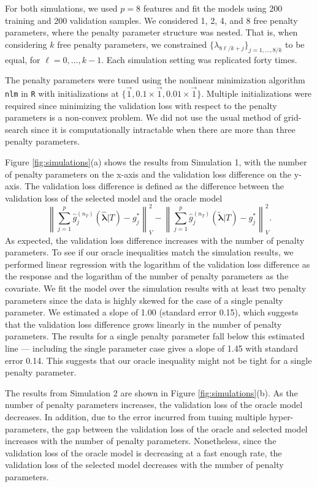 \documentclass[12pt]{article} %
\theoremstyle{definition}
\begin{document}
For both simulations, we used $p = 8$ features and fit the models using 200 training and 200 validation samples. We considered 1, 2, 4, and 8 free penalty parameters, where the penalty parameter structure was nested. That is, when considering $k$ free penalty parameters, we constrained $\{\lambda_{8\ell/k + j} \}_{j = 1,...,8/k}$ to be equal, for $\ell= 0,...,k - 1$. Each simulation setting was replicated forty times.

The penalty parameters were tuned using the nonlinear minimization algorithm \texttt{nlm} in \texttt{R} with initializations at $\{\vec{1}, 0.1 \times \vec{1}, 0.01 \times \vec{1}\}$. 
Multiple initializations were required since minimizing the validation loss with respect to the penalty parameters is a non-convex problem.
We did not use the usual method of grid-search since it is computationally intractable when there are more than three penalty parameters.

Figure \ref{fig:simulations}(a) shows the results from Simulation 1, with the number of penalty parameters on the x-axis and the validation loss difference on the y-axis. The validation loss difference is defined as the difference between the validation loss of the selected model and the oracle model
$$
\left \| \sum_{j=1}^p \hat{g}^{(n_T)}_j(\hat{\boldsymbol{\lambda}}|T) - g^*_j \right \|_V^2 - 
\left \| \sum_{j=1}^p \hat{g}^{(n_T)}_j(\tilde{\boldsymbol{\lambda}} | T) - g^*_j \right \|_V^2.
$$
As expected, the validation loss difference increases with the number of penalty parameters.
To see if our oracle inequalities match the simulation results, we performed linear regression with the logarithm of the validation loss difference as the response and the logarithm of the number of penalty parameters as the covariate. 
We fit the model over the simulation results with at least two penalty parameters since the data is highly skewed for the case of a single penalty parameter. 
We estimated a slope of 1.00 (standard error 0.15), which suggests that the validation loss difference grows linearly in the number of penalty parameters. 
The results for a single penalty parameter fall below this estimated line --- including the single parameter case gives a slope of 1.45 with standard error 0.14.
This suggests that our oracle inequality might not be tight for a single penalty parameter.

The results from Simulation 2 are shown in Figure \ref{fig:simulations}(b). As the number of penalty parameters increases, the validation loss of the oracle model decreases. In addition, due to the error incurred from tuning multiple hyper-parameters, the gap between the validation loss of the oracle and selected model increases with the number of penalty parameters. Nonetheless, since the validation loss of the oracle model is decreasing at a fast enough rate, the validation loss of the selected model decreases with the number of penalty parameters.
\end{document}
